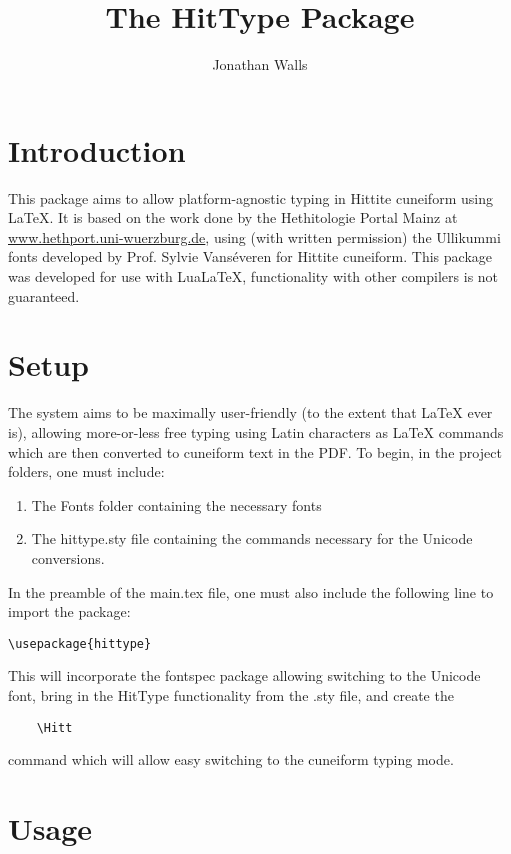 \documentclass[12pt,A4]{article}
\title{The HitType Package}
\author{Jonathan Walls}
\begin{document}
\maketitle

\section{Introduction}

This package aims to allow platform-agnostic typing in Hittite cuneiform using LaTeX. It is based on the work done by the Hethitologie Portal Mainz at \href{https://www.hethport.uni-wuerzburg.de/cuneifont/}{www.hethport.uni-wuerzburg.de}, using (with written permission) the Ullikummi fonts developed by Prof. Sylvie Vanséveren for Hittite cuneiform. This package was developed for use with LuaLaTeX, functionality with other compilers is not guaranteed.

\section{Setup}
The system aims to be maximally user-friendly (to the extent that LaTeX ever is), allowing more-or-less free typing using Latin characters as LaTeX commands which are then converted to cuneiform text in the PDF. To begin, in the project folders, one must include:
\begin{enumerate}
    \item The Fonts folder containing the necessary fonts
    \item The hittype.sty file containing the commands necessary for the Unicode conversions.
\end{enumerate}

In the preamble of the main.tex file, one must also include the following line to import the package:\small
\begin{verbatim}
\usepackage{hittype}
\end{verbatim}
\normalsize
This will incorporate the fontspec package allowing switching to the Unicode font, bring in the HitType functionality from the .sty file, and create the 
\begin{verbatim}
    \Hitt
\end{verbatim} 
command which will allow easy switching to the cuneiform typing mode.

\section{Usage}
\end{document}
